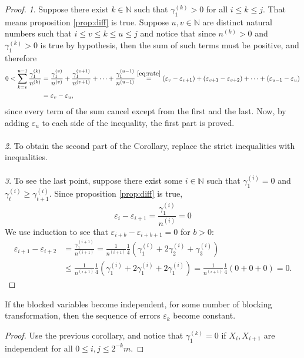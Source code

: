 \documentclass[11pt,english,a4paper]{article}
\begin{document}
\begin{proof}
\textit{1}. Suppose there exist $k \in \mathbb{N}$ such that $\gamma^{(k)}_1 > 0$ for all $i \leq k \leq j$. That means proposition \ref{prop:diff} is true. Suppose $u,v \in \mathbb{N}$ are distinct natural numbers such that $i \leq v \leq k \leq u \leq j$ and notice that since $n^{(k)} > 0$ and $\gamma^{(k)}_1 > 0$ is true by hypothesis, then the sum of such terms must be positive, and therefore
\begin{align*}
0 < \sum_{k = v}^{u-1} \frac{\gamma^{(k)}_1 }{n^{(k)}} &= \frac{\gamma^{(v)}_1}{n^{(v)}} + \frac{\gamma^{(v+1)}_1}{n^{(v+1)}} + \cdots + \frac{\gamma^{(u-1)}_1}{n^{(u-1)}} \stackrel{\eqref{eq:rate}}{=} (\varepsilon_v - \varepsilon_{v+1}) + (\varepsilon_{v+1} - \varepsilon_{v+2}) + \cdots + (\varepsilon_{u-1} - \varepsilon_{u}) \\
&= \varepsilon_v - \varepsilon_{u},
\end{align*}
since every term of the sum cancel except from the first and the last. Now, by adding $\varepsilon_u$ to each side of the inequality, the first part is proved. \\
\\
\textit{2}. To obtain the second part of the Corollary, replace the strict inequalities with inequalities.\\
\\
\textit{3}. To see the last point, suppose there exist some $i \in \mathbb{N}$ such that $\gamma^{(i)}_1 = 0$ and $\gamma^{(i)}_t \geq \gamma^{(i)}_{t+1}$. Since proposition \ref{prop:diff} is true,
\[
\varepsilon_i - \varepsilon_{i+1} = \frac{\gamma_1^{(i)}}{n^{(i)}} = 0
\]
We use induction to see that $\varepsilon_{i+b} - \varepsilon_{i+b+1} = 0$ for $b > 0$:
\begin{align*}
\varepsilon_{i+1} - \varepsilon_{i+2} &= \frac{\gamma_1^{(i+1)}}{n^{(i+1)}} = \frac{1}{n^{(i+1)}} \frac{1}{4} \left( \gamma^{(i)}_{1} + 2 \gamma^{(i)}_{2} + \gamma^{(i)}_{3} \right) \\
&\leq \frac{1}{n^{(i+1)}} \frac{1}{4} \left( \gamma^{(i)}_{1} + 2 \gamma^{(i)}_{1} + 2 \gamma^{(i)}_{1} \right) = \frac{1}{n^{(i+1)}} \frac{1}{4} \left( 0+0+0 \right) = 0.
\end{align*}
\end{proof}

\begin{corollary}
If the blocked variables become independent, for some number of blocking transformation, then the sequence of errors $\varepsilon_k$ become constant.
\end{corollary}
\begin{proof}
Use the previous corollary, and notice that $\gamma^{(k)}_1 = 0$ if $X_i,X_{i+1}$ are independent for all $0 \leq i,j \leq 2^{-k}m$.
\end{proof}
\end{document}
